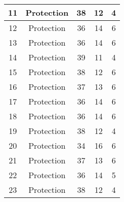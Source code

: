 \documentclass[results.tex]{subfiles}
\begin{document}
\begin{center}
\begin{tabular}{| c || c | c | c | c |}
            \hline
            11                      & Protection                   & 38                     & 12                      & 4                    \\
            \hline
            12                      & Protection                   & 36                     & 14                      & 6                    \\
            \hline
            13                      & Protection                   & 36                     & 14                      & 6                    \\
            \hline
            14                      & Protection                   & 39                     & 11                      & 4                    \\
            \hline
            15                      & Protection                   & 38                     & 12                      & 6                    \\
            \hline
            16                      & Protection                   & 37                     & 13                      & 6                    \\
            \hline
            17                      & Protection                   & 36                     & 14                      & 6                    \\
            \hline
            18                      & Protection                   & 36                     & 14                      & 6                    \\
            \hline
            19                      & Protection                   & 38                     & 12                      & 4                    \\
            \hline
            20                      & Protection                   & 34                     & 16                      & 6                    \\
            \hline
            21                      & Protection                   & 37                     & 13                      & 6                    \\
            \hline
            22                      & Protection                   & 36                     & 14                      & 5                    \\
            \hline
            23                      & Protection                   & 38                     & 12                      & 4                    \\

\end{tabular}
\end{center}
\end{document}
